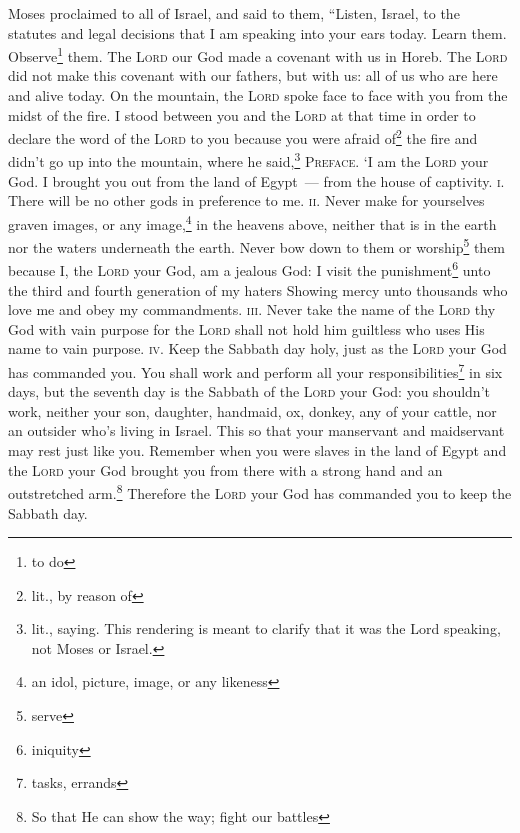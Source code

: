 
\begin{inparaenum}
     Moses proclaimed to all of Israel, and said to them, ``Listen, Israel, to the statutes and legal decisions that I am speaking into your ears today. Learn them. Observe\footnote{to do} them.%
     The \textsc{Lord} our God made a covenant with us in Horeb.%
     The \textsc{Lord} did not make this covenant with our fathers, but with us: all of us who are here and alive today.%
     On the mountain, the \textsc{Lord} spoke face to face with you from the midst of the fire.%
     I stood between you and the \textsc{Lord} at that time in order to declare the word of the \textsc{Lord} to you because you were afraid of\footnote{lit., by reason of} the fire and didn't go up into the mountain, where he said,\footnote{lit., saying. This rendering is meant to clarify that it was the Lord speaking, not Moses or Israel.}%
     \textsc{Preface.} `I am the \textsc{Lord} your God. I brought you out from the land of Egypt~--- from the house of captivity.%
     \textsc{i.} There will be no other gods in preference to me.%
     \textsc{ii.} Never make for yourselves graven images, or any image,\footnote{an idol, picture, image, or any likeness} in the heavens above, neither that is in the earth nor the waters underneath the earth.%
     Never bow down to them or worship\footnote{serve} them because I, the \textsc{Lord} your God, am a jealous God: I visit the punishment\footnote{iniquity} unto the third and fourth generation of my haters%
     Showing mercy unto thousands who love me and obey my commandments.%
     \textsc{iii.} Never take the name of the \textsc{Lord} thy God with vain purpose for the \textsc{Lord} shall not hold him guiltless who uses His name to vain purpose.%
     \textsc{iv.} Keep the Sabbath day holy, just as the \textsc{Lord} your God has commanded you.%
     You shall work and perform all your responsibilities\footnote{tasks, errands} in six days,%
     but the seventh day is the Sabbath of the \textsc{Lord} your God: you shouldn't work, neither your son, daughter, handmaid, ox, donkey, any of your cattle, nor an outsider who's living in Israel. This so that your manservant and maidservant may rest just like you.%
     Remember when you were slaves in the land of Egypt and the \textsc{Lord} your God brought you from there with a strong hand and an outstretched arm.\footnote{So that He can show the way; fight our battles} Therefore the \textsc{Lord} your God has commanded you to keep the Sabbath day.%

\end{inparaenum}
